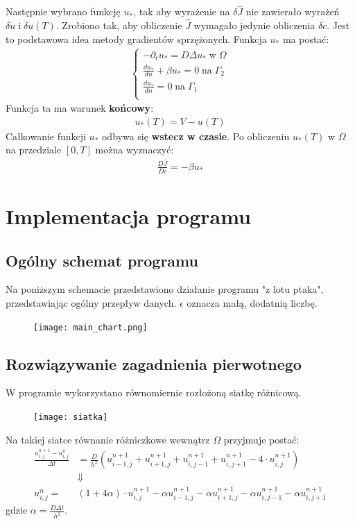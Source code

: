 \documentclass{article}
\begin{document}
Następnie wybrano funkcję $u_*$, tak aby wyrażenie na $\delta\hat{J}$ nie zawierało wyrażeń $\delta u \;\text{i}\; \delta u(T)$. Zrobiono tak, aby obliczenie $\hat{J}$ wymagało jedynie obliczenia $\delta c$. Jest to podstawowa idea metody gradientów sprzężonych.
Funkcja $u_*$ ma postać:
\begin{align*}
	\begin{cases}
		-\partial_t u_* = D\Delta u_* \;\text{w}\; \Omega \\
		\frac{du_*}{dn} + \beta u_* = 0 \; \text{na} \; \Gamma_2\\
		\frac{du_*}{dn} = 0 \; \text{na} \; \Gamma_1\\
	\end{cases}
\end{align*}
Funkcja ta ma warunek \textbf{końcowy}:
\begin{align*}
	u_*(T) = V - u(T)
\end{align*}
Całkowanie funkcji $u_*$ odbywa się \textbf{wstecz w czasie}.
Po obliczeniu $u_*(T)$ w $\Omega$ na przedziale $[0, T]$ można wyznaczyć:
\begin{align*}
	\frac{D\hat{J}}{Dc} = -\beta u_*
\end{align*}
\section{Implementacja programu}
\subsection{Ogólny schemat programu}
Na poniższym schemacie przedstawiono działanie programu "z lotu ptaka", przedstawiając ogólny przepływ danych. $\epsilon$ oznacza małą, dodatnią liczbę.
\begin{figure}[H]
	\centering
	\texttt{[image: main\_chart.png]}
\end{figure}
\subsection{Rozwiązywanie zagadnienia pierwotnego}
W programie wykorzystano równomiernie rozłożoną siatkę różnicową.
\begin{figure}[H]
	\centering
	\texttt{[image: siatka]}
	\label{fig:siatka}
\end{figure}
Na takiej siatce równanie różniczkowe wewnątrz $\Omega$ przyjmuje postać:
\begin{align*}
	\frac{u_{i,j}^{n+1}- u_{i,j}^n}{\Delta t} &= \frac{D}{h^2}(u_{i-1,j}^{n+1}+u_{i+1,j}^{n+1}+u_{i,j-1}^{n+1}+u_{i,j+1}^{n+1}-4\cdot u_{i,j}^{n+1})\\
	&\Downarrow\\
	u_{i,j}^n=& (1+4\alpha)\cdot u_{i,j}^{n+1} - \alpha u_{i-1,j}^{n+1}-\alpha u_{i+1,j}^{n+1}-\alpha u_{i,j-1}^{n+1}-\alpha u_{i,j+1}^{n+1}
\end{align*}
gdzie $\alpha = \frac{D\Delta t}{h^2}$.
\newpage
\end{document}
